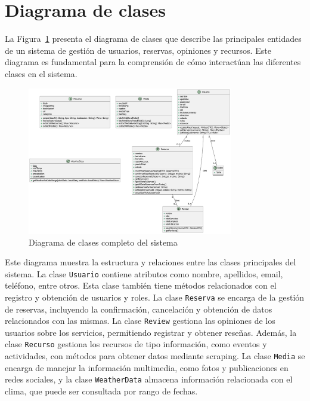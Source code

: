 \section{Diagrama de clases}
\label{ch:clases}
La Figura~\ref{fig:clases_disenyo} presenta el diagrama de clases que describe las principales entidades de un sistema de gestión de usuarios, reservas, opiniones y recursos. Este diagrama es fundamental para la comprensión de cómo interactúan las diferentes clases en el sistema.

\begin{figure}
    \centering
    \includegraphics[width=0.8\textwidth]{figs/clases.pdf} 
    \caption{Diagrama de clases completo del sistema\label{fig:clases_disenyo}}
\end{figure}



Este diagrama muestra la estructura y relaciones entre las clases principales del sistema. La clase \texttt{Usuario} contiene atributos como nombre, apellidos, email, teléfono, entre otros. Esta clase también tiene métodos relacionados con el registro y obtención de usuarios y roles. La clase \texttt{Reserva} se encarga de la gestión de reservas, incluyendo la confirmación, cancelación y obtención de datos relacionados con las mismas. La clase \texttt{Review} gestiona las opiniones de los usuarios sobre los servicios, permitiendo registrar y obtener reseñas. Además, la clase \texttt{Recurso} gestiona los recursos de tipo información, como eventos y actividades, con métodos para obtener datos mediante scraping. La clase \texttt{Media} se encarga de manejar la información multimedia, como fotos y publicaciones en redes sociales, y la clase \texttt{WeatherData} almacena información relacionada con el clima, que puede ser consultada por rango de fechas.


